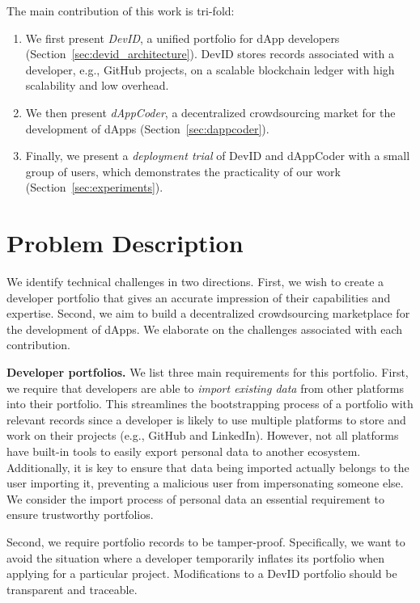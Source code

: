 The main contribution of this work is tri-fold:
\begin{enumerate}
	\item We first present \emph{DevID}, a unified portfolio for dApp developers (Section~\ref{sec:devid_architecture}). DevID stores records associated with a developer, e.g., GitHub projects, on a scalable blockchain ledger with high scalability and low overhead.
	\item We then present \emph{dAppCoder}, a decentralized crowdsourcing market for the development of dApps (Section~\ref{sec:dappcoder}).
	\item Finally, we present a \emph{deployment trial} of DevID and dAppCoder with a small group of users, which demonstrates the practicality of our work (Section~\ref{sec:experiments}).
\end{enumerate}

\section{Problem Description}
\label{sec:dappcoder_problem_description}
We identify technical challenges in two directions.
First, we wish to create a developer portfolio that gives an accurate impression of their capabilities and expertise.
Second, we aim to build a decentralized crowdsourcing marketplace for the development of dApps.
We elaborate on the challenges associated with each contribution.

\textbf{Developer portfolios.}
We list three main requirements for this portfolio.
First, we require that developers are able to \emph{import existing data} from other platforms into their portfolio.
This streamlines the bootstrapping process of a portfolio with relevant records since a developer is likely to use multiple platforms to store and work on their projects (e.g., GitHub and LinkedIn).
However, not all platforms have built-in tools to easily export personal data to another ecosystem.
Additionally, it is key to ensure that data being imported actually belongs to the user importing it, preventing a malicious user from impersonating someone else.
We consider the import process of personal data an essential requirement to ensure trustworthy portfolios.

Second, we require portfolio records to be tamper-proof.
Specifically, we want to avoid the situation where a developer temporarily inflates its portfolio when applying for a particular project.
Modifications to a DevID portfolio should be transparent and traceable.


